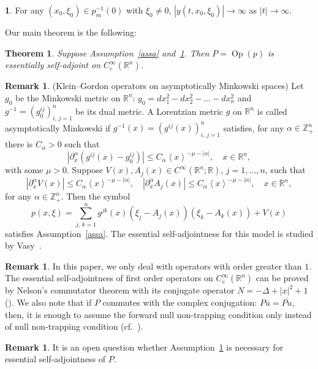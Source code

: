 \documentclass[10pt]{amsart}
\newtheorem{theo}[cdrthm]{Theorem}
\theoremstyle{definition}
\newtheorem{rema}[cdrthm]{Remark}
\newtheorem{sourceenonce}[cdrthm]{\SourceEnonceName}
\newenvironment{enonce}[2][plain]{\def\SourceEnonceName{#2}\begin{sourceenonce}}{\end{sourceenonce}}
\renewcommand*\a{\alpha}
\newcommand*\m{\mu}
\newcommand*\x{\xi}
\DeclareMathOperator{\Op}{Op}
\newcommand*\re{\mathbb{R}}
\newcommand*\ze{\mathbb{Z}}
\newcommand*\pa{\partial}
\newcommand{\jap}[1]{\left\langle #1 \right\rangle}
\begin{document}
\begin{enonce}[plain]{Assumption}\label{assnull}
For any $(x_0, \x_0)\in p_m^{-1}(0)$ with $\x_0\neq 0$, $| y(t, x_0, \x_0) | \to \infty$ as $|t|\to \infty$.
\end{enonce}

Our main theorem is the following:


\begin{theo}\label{nullthm}
Suppose Assumption~\ref{assa} and~\ref{assnull}. Then $P=\Op(p)$ is essentially self-adjoint on $C_c^\infty(\re^n)$.
\end{theo}


\begin{rema}\label{basicexample}
(Klein--Gordon operators on asymptotically Minkowski spaces) Let $g_0$ be the Minkowski metric on $\re^n$: $g_0=dx_1^2-dx_2^2-\dots-dx_n^2$ and $g^{-1}=(g^{ij}_0)_{i,\,j=1}^n$ be its dual metric. A Lorentzian metric $g$ on $\re^n$ is called asymptotically Minkowski if $g^{-1}(x)=(g^{ij}(x))_{i,\,j=1}^n$ satisfies, for any $\a\in\ze_+^n$ there is $C_\a>0$ such that
\[
\left|\pa_{x}^{\a}\left(g^{ij}(x)- g_0^{ij}\right)\right|\leq C_{\a}\jap{x}^{-\m-|\a|},\quad x\in\re^n,
\]
with some $\m>0$. Suppose $V(x), A_j(x)\in C^\infty(\re^n;\re)$, $j=1,\dots, n$, such that
\[
\left|\pa_{x}^{\a}V(x)\right|\leq C_{\a}\jap{x}^{-\m-|\a|}, \quad \left|\pa_{x}^{\a}A_j(x)\right|\leq C_{\a}\jap{x}^{-\m-|\a|},
\quad x\in\re^n,
\]
for any $\a\in\ze_+^n$. Then the symbol
\[
p(x,\x)=\sum_{j,\,k=1}^ng^{jk}(x)\left(\x_j-A_j(x)\right)\left(\x_k-A_k(x)\right) +V(x)
\]
satisfies Assumption~\ref{assa}. The essential self-adjointness for this model is studied by Vasy~\cite{Va1}.
\end{rema}


\begin{rema}
In this paper, we only deal with operators with order greater than $1$. The essential self-adjointness of first order operators on $C_c^{\infty}(\re^n)$ can be proved by Nelson's commutator theorem with its conjugate operator $N=-\Delta+|x|^2+1$ (\cite[Theorem~X.36]{RS}). We also note that if $P$ commutes with the complex conjugation: $P\overline{u}=\overline{Pu}$, then, it is enough to assume the forward null non-trapping condition only instead of null non-trapping condition (cf.~\cite[Theorem~X.3]{RS}).
\end{rema}


\begin{rema}
It is an open question whether Assumption~\ref{assnull} is necessary for essential self-adjointness of $P$.
\end{rema}
\end{document}
